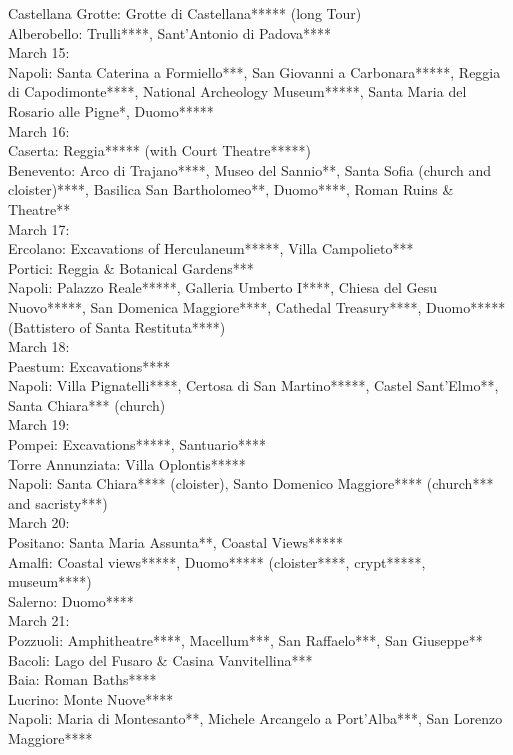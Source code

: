 Castellana Grotte: Grotte di Castellana***** (long Tour)\\
Alberobello: Trulli****, Sant'Antonio di Padova****\\

March 15:\\
Napoli: Santa Caterina a Formiello***, San Giovanni a Carbonara*****, Reggia di Capodimonte****, National Archeology Museum*****, Santa Maria del Rosario alle Pigne*, Duomo*****\\

March 16:\\
Caserta: Reggia***** (with Court Theatre*****)\\
Benevento: Arco di Trajano****, Museo del Sannio**, Santa Sofia (church and cloister)****, Basilica San Bartholomeo**, Duomo****, Roman Ruins \& Theatre**\\

March 17:\\
Ercolano: Excavations of Herculaneum*****, Villa Campolieto***\\
Portici: Reggia \& Botanical Gardens***\\
Napoli: Palazzo Reale*****, Galleria Umberto I****, Chiesa del Gesu Nuovo*****, San Domenica Maggiore****, Cathedal Treasury****, Duomo***** (Battistero of Santa Restituta****)\\

March 18:\\
Paestum: Excavations****\\
Napoli: Villa Pignatelli****, Certosa di San Martino*****, Castel Sant'Elmo**, Santa Chiara*** (church)\\

March 19:\\
Pompei: Excavations*****, Santuario****\\
Torre Annunziata: Villa Oplontis*****\\
Napoli: Santa Chiara**** (cloister), Santo Domenico Maggiore**** (church*** and sacristy***)\\

March 20:\\
Positano: Santa Maria Assunta**, Coastal Views*****\\
Amalfi: Coastal views*****, Duomo***** (cloister****, crypt*****, museum****)\\
Salerno: Duomo****\\

March 21:\\
Pozzuoli: Amphitheatre****, Macellum***, San Raffaelo***, San Giuseppe**\\
Bacoli: Lago del Fusaro \& Casina Vanvitellina***\\
Baia: Roman Baths****\\
Lucrino: Monte Nuove****\\
Napoli: Maria di Montesanto**, Michele Arcangelo a Port'Alba***, San Lorenzo Maggiore****


